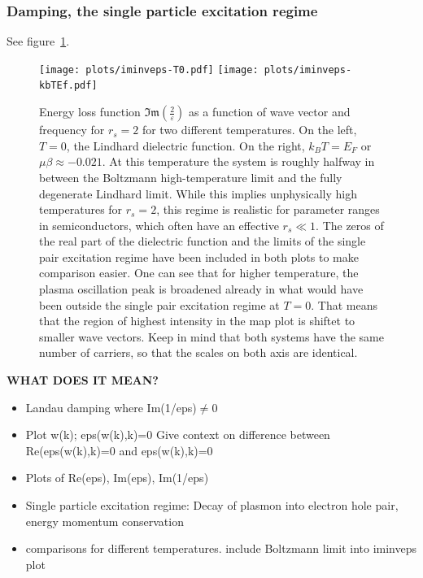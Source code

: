 \documentclass[physics,phd,nolot,nolof]{uccthesis}%
\newcommand{\alert}[1]{\textbf{\color{red}#1}}
\begin{document}
{\subsubsection{Damping, the single particle excitation regime}
See figure~\ref{fig:iminveps}.
\begin{figure}[tp]
  \begin{center}
\texttt{[image: plots/iminveps-T0.pdf]}%
\texttt{[image: plots/iminveps-kbTEf.pdf]}%
  \end{center}
  \caption{Energy loss function $\mathfrak{Im}(\frac{2}{\varepsilon})$ as 
  a function of wave vector and frequency for $r_s=2$ for two different 
  temperatures.
  On the left, $T = 0$, the Lindhard dielectric function. 
  On the right, $k_BT = E_F$ or $\mu\beta\approx -0.021$. 
  At this temperature the system is roughly halfway in between 
  the Boltzmann high-temperature limit and the fully degenerate 
  Lindhard limit.
  While this implies unphysically high temperatures for $r_s=2$, this 
  regime is realistic for parameter ranges in semiconductors, which often
  have an effective $r_s \ll 1$.
  The zeros of the real part of the dielectric function and the limits of the 
  single pair excitation regime have been included in both plots to make 
  comparison easier.
  One can see that for higher temperature, the plasma oscillation peak is broadened
  already in what would have been outside the single pair excitation regime at $T=0$.
  That means that the region of highest intensity in the map plot is shiftet to 
  smaller wave vectors.
  Keep in mind that both systems have the same number of carriers, so that the
  scales on both axis are identical.
  }
  \label{fig:iminveps}
\end{figure}
\alert{
WHAT DOES IT MEAN?}
\begin{itemize}
  \item Landau damping where Im(1/eps)$\neq0$
  \item Plot w(k); eps(w(k),k)=0
    Give context on difference between Re(eps(w(k),k)=0 and eps(w(k),k)=0
  \item Plots of Re(eps), Im(eps), Im(1/eps) 
  \item Single particle excitation regime:
    Decay of plasmon into electron hole pair, energy momentum conservation
  \item comparisons for different temperatures.
    include Boltzmann limit into iminveps plot
\end{itemize}
}
\end{document}
